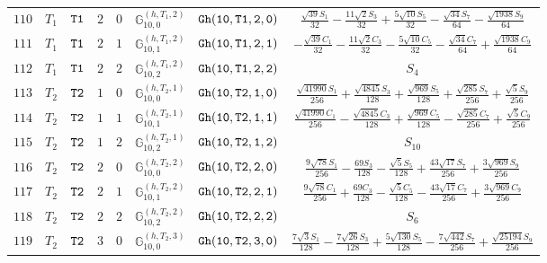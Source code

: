 \documentclass[fleqn,8pt]{jsarticle}
\begin{document}
\begin{table}[ht!]
\begin{center}
\begin{tabular}{cccccccc}
$ 110 $ & $ T_{1} $ & $ {\tt T1} $ & $ 2 $ & $ 0 $ & $ \mathbb{G}_{10,0}^{(h,T_{1},2)} $ & $ {\tt Gh(10,T1,2,0)} $ & $ \frac{\sqrt{39} S_{1}}{32} - \frac{11 \sqrt{2} S_{3}}{32} + \frac{5 \sqrt{10} S_{5}}{32} - \frac{\sqrt{34} S_{7}}{64} - \frac{\sqrt{1938} S_{9}}{64} $ \\
$ 111 $ & $ T_{1} $ & $ {\tt T1} $ & $ 2 $ & $ 1 $ & $ \mathbb{G}_{10,1}^{(h,T_{1},2)} $ & $ {\tt Gh(10,T1,2,1)} $ & $ - \frac{\sqrt{39} C_{1}}{32} - \frac{11 \sqrt{2} C_{3}}{32} - \frac{5 \sqrt{10} C_{5}}{32} - \frac{\sqrt{34} C_{7}}{64} + \frac{\sqrt{1938} C_{9}}{64} $ \\
$ 112 $ & $ T_{1} $ & $ {\tt T1} $ & $ 2 $ & $ 2 $ & $ \mathbb{G}_{10,2}^{(h,T_{1},2)} $ & $ {\tt Gh(10,T1,2,2)} $ & $ S_{4} $ \\
$ 113 $ & $ T_{2} $ & $ {\tt T2} $ & $ 1 $ & $ 0 $ & $ \mathbb{G}_{10,0}^{(h,T_{2},1)} $ & $ {\tt Gh(10,T2,1,0)} $ & $ \frac{\sqrt{41990} S_{1}}{256} + \frac{\sqrt{4845} S_{3}}{128} + \frac{\sqrt{969} S_{5}}{128} + \frac{\sqrt{285} S_{7}}{256} + \frac{\sqrt{5} S_{9}}{256} $ \\
$ 114 $ & $ T_{2} $ & $ {\tt T2} $ & $ 1 $ & $ 1 $ & $ \mathbb{G}_{10,1}^{(h,T_{2},1)} $ & $ {\tt Gh(10,T2,1,1)} $ & $ \frac{\sqrt{41990} C_{1}}{256} - \frac{\sqrt{4845} C_{3}}{128} + \frac{\sqrt{969} C_{5}}{128} - \frac{\sqrt{285} C_{7}}{256} + \frac{\sqrt{5} C_{9}}{256} $ \\
$ 115 $ & $ T_{2} $ & $ {\tt T2} $ & $ 1 $ & $ 2 $ & $ \mathbb{G}_{10,2}^{(h,T_{2},1)} $ & $ {\tt Gh(10,T2,1,2)} $ & $ S_{10} $ \\
$ 116 $ & $ T_{2} $ & $ {\tt T2} $ & $ 2 $ & $ 0 $ & $ \mathbb{G}_{10,0}^{(h,T_{2},2)} $ & $ {\tt Gh(10,T2,2,0)} $ & $ \frac{9 \sqrt{78} S_{1}}{256} - \frac{69 S_{3}}{128} - \frac{\sqrt{5} S_{5}}{128} + \frac{43 \sqrt{17} S_{7}}{256} + \frac{3 \sqrt{969} S_{9}}{256} $ \\
$ 117 $ & $ T_{2} $ & $ {\tt T2} $ & $ 2 $ & $ 1 $ & $ \mathbb{G}_{10,1}^{(h,T_{2},2)} $ & $ {\tt Gh(10,T2,2,1)} $ & $ \frac{9 \sqrt{78} C_{1}}{256} + \frac{69 C_{3}}{128} - \frac{\sqrt{5} C_{5}}{128} - \frac{43 \sqrt{17} C_{7}}{256} + \frac{3 \sqrt{969} C_{9}}{256} $ \\
$ 118 $ & $ T_{2} $ & $ {\tt T2} $ & $ 2 $ & $ 2 $ & $ \mathbb{G}_{10,2}^{(h,T_{2},2)} $ & $ {\tt Gh(10,T2,2,2)} $ & $ S_{6} $ \\
$ 119 $ & $ T_{2} $ & $ {\tt T2} $ & $ 3 $ & $ 0 $ & $ \mathbb{G}_{10,0}^{(h,T_{2},3)} $ & $ {\tt Gh(10,T2,3,0)} $ & $ \frac{7 \sqrt{3} S_{1}}{128} - \frac{7 \sqrt{26} S_{3}}{128} + \frac{5 \sqrt{130} S_{5}}{128} - \frac{7 \sqrt{442} S_{7}}{256} + \frac{\sqrt{25194} S_{9}}{256} $ \\

\end{tabular}
\end{center}
\end{table}
\end{document}
